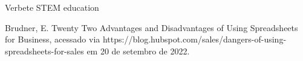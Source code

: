 \documentclass[
12pt,		%
openright,	%
twoside,  %
a4paper,			%
chapter=TITLE,		%
english,			%
french,				%
spanish,			%
brazil				%
]{USPSC-classe/USPSC}
\begin{document}
\begin{flushleft}
\begin{flushleft}
\begin{flushleft}
\begin{flushleft}
\begin{flushleft}
\begin{flushleft}
\begin{flushleft}
\begin{flushleft}
\begin{flushleft}
[BRITANNICA, 2022a] Verbete STEM education
\end{flushleft}


\end{flushleft}


\end{flushleft}


\end{flushleft}


\end{flushleft}


\end{flushleft}


\end{flushleft}


\end{flushleft}


\end{flushleft}


\begin{flushleft}
\begin{flushleft}
\begin{flushleft}
\begin{flushleft}
\begin{flushleft}
\begin{flushleft}
\begin{flushleft}
\begin{flushleft}
\begin{flushleft}
[BRUDNER, 2022] Brudner, E. Twenty Two Advantages and Disadvantages of Using Spreadsheets for Business, acessado via https://blog.hubspot.com/sales/dangers-of-using-spreadsheets-for-sales em 20 de setembro de 2022.
\end{flushleft}


\end{flushleft}


\end{flushleft}


\end{flushleft}


\end{flushleft}


\end{flushleft}


\end{flushleft}


\end{flushleft}


\end{flushleft}
\end{document}
